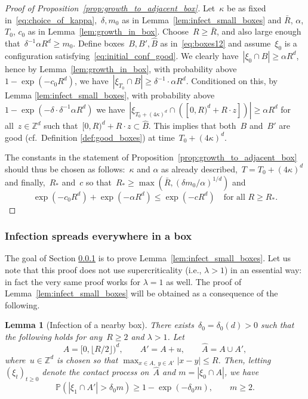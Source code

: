 \documentclass[a4paper,12pt]{article}
\newtheorem  {lemma}         [theorem]{Lemma}
\newcommand{\Z}{\mathbb{Z}}
\begin{document}
\begin{proof}[Proof of Proposition~\ref{prop:growth_to_adjacent_box}]
Let~$\kappa$ be as fixed in~\eqref{eq:choice_of_kappa},~$\delta, m_0$ as in Lemma~\ref{lem:infect_small_boxes} and $\bar{R}$, $\alpha$, $T_0$, $c_0$ as in Lemma~\ref{lem:growth_in_box}. Choose~$R \geq \bar{R}$, and also large enough that~$\delta^{-1}\alpha R^d \geq m_0$. Define boxes~$B,B',\widehat{B}$ as in~\eqref{eq:boxes12} and assume~$\xi_0$ is a configuration satisfying~\eqref{eq:initial_conf_good}. We clearly have~$|\xi_0 \cap B| \geq \alpha R^d$, hence by Lemma~\ref{lem:growth_in_box}, with probability above~$1-\exp(-c_0 R^d)$, we have~$|\xi_{T_0} \cap B| \geq \delta^{-1}\cdot \alpha R^d$. Conditioned on this, by Lemma \ref{lem:infect_small_boxes}, with probability above~$1 - \exp(- \delta \cdot \delta^{-1}\alpha R^d)$ we have~$|\xi_{T_0 + (4\kappa)^d} \cap ([0,R)^d + R \cdot z])| \geq \alpha R^d$ for all~$z \in \Z^d$ such that~$[0,R)^d + R\cdot z \subset \widehat{B}$. This implies that both~$B$ and~$B'$ are good (cf.\ Definition \ref{def:good_boxes}) at time~$T_0 + (4\kappa)^d$.

\smallskip

The constants in the statement of Proposition~\ref{prop:growth_to_adjacent_box} should thus be chosen as follows:~$\kappa$ and $\alpha$ as already described,~$T = T_0 + (4\kappa)^d$ and finally,~$R_*$ and~$c$ so that~$R_* \geq \max(\bar{R}, (\delta m_0/\alpha)^{1/d})$ and
$$ \exp(-c_0R^d) + \exp(-\alpha R^d) \leq \exp(-cR^d) \quad \text{for all } R \geq R_*. $$
\end{proof}


\subsubsection{Infection spreads everywhere in a box }\label{subsub_infect_spreads}

The goal of Section \ref{subsub_infect_spreads} is to prove Lemma~\ref{lem:infect_small_boxes}.
Let us note that this proof does not  use supercriticality (i.e., $\lambda>1$) in an essential way: in fact the very same proof works for
$\lambda=1$ as well. The proof of Lemma~\ref{lem:infect_small_boxes} will be obtained as a consequence of the following.
\begin{lemma}[Infection of a nearby box]\label{lem:growth_to_neighbor}
There exists~$\delta_0=\delta_0(d)  > 0$ such that the following holds for any~$R \geq 2$ and $\lambda>1$. Let
$$A = [0, \lfloor  R/2 \rfloor )^d,\qquad  A' = A +  u,\qquad  \widehat{A} = A \cup A',$$
where~$u \in \mathbb{Z}^d$ is chosen so that $\max_{x \in A,\; y \in A'} |x-y| \leq R$. Then, letting~$(\xi_t)_{t \geq 0}$ denote the contact process on~$\widehat{A}$ and
$m = |\xi_0 \cap A|$, we have
\begin{equation}\label{eq_growth_to_neigh}
\mathbb{P}\left(|\xi_1 \cap A'| > \delta_0 m \right) \ge 1-\exp\left(- \delta_0 m\right), \qquad m \geq 2.
\end{equation}
\end{lemma}
\end{document}
